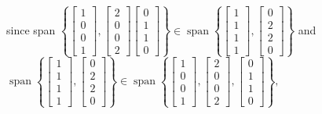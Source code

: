 \documentclass[11pt]{article}
\begin{document}
\begin{enumerate}[{\bf Q1.}]
\begin{enumerate}
			since span $\left\{\left[\begin{array}{l}1 \\ 0 \\ 0 \\ 1\end{array}\right],\left[\begin{array}{l}2 \\ 0 \\ 0 \\ 2\end{array}\right]\left[\begin{array}{l}0 \\ 1 \\ 1 \\ 0\end{array}\right]\right\} \in \operatorname{span}\left\{\left[\begin{array}{c}1 \\ 1 \\ 1 \\ 1\end{array}\right],\left[\begin{array}{l}0 \\ 2 \\ 2 \\ 0\end{array}\right]\right\}$
			and $\operatorname{span}\left\{\left[\begin{array}{l}1 \\ 1 \\ 1 \\ 1\end{array}\right],\left[\begin{array}{l}0 \\ 2 \\ 2 \\ 0\end{array}\right]\right\} \in \operatorname{span}\left\{\left[\begin{array}{l}1 \\ 0 \\ 0 \\ 1\end{array}\right],\left[\begin{array}{l}2 \\ 0 \\ 0 \\ 2\end{array}\right],\left[\begin{array}{l}0 \\ 1 \\ 1 \\ 0\end{array}\right]\right\}, $

\end{enumerate}
\end{enumerate}
\end{document}
